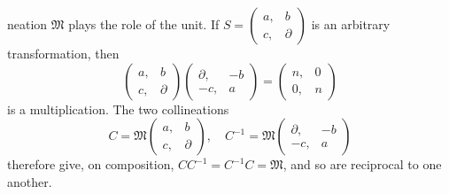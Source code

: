 neation $\mathfrak{M}$ plays the role of the unit. If $S = \begin{pmatrix} a, & b \\ c, & \partial \end{pmatrix}$ is an arbitrary transformation, then
\[
\begin{pmatrix} a, & b \\ c, & \partial \end{pmatrix}\begin{pmatrix} \partial, & -b \\ -c, & a \end{pmatrix} = \begin{pmatrix} n, & 0 \\ 0, & n \end{pmatrix}
\]
is a multiplication. The two collineations
\[
C = \mathfrak{M}\begin{pmatrix} a, & b \\ c, & \partial \end{pmatrix}, \quad C^{-1} = \mathfrak{M}\begin{pmatrix} \partial, & -b \\ -c, & a \end{pmatrix}
\]
therefore give, on composition, $CC^{-1} = C^{-1}C = \mathfrak{M}$, and so are reciprocal to one another.

\begin{center}
\end{center}


